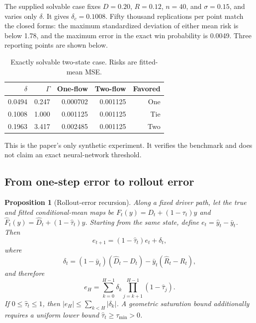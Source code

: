 \documentclass[twoside]{article}
\theoremstyle{plain}
\newtheorem{proposition}{Proposition}
\theoremstyle{definition}
\theoremstyle{remark}
\begin{document}
The supplied solvable case fixes \(D=0.20\), \(R=0.12\), \(n=40\), and
\(\sigma=0.15\), and varies only \(\delta\). It gives
\(\delta_c=0.1008\). Fifty thousand replications per point match the closed
forms: the maximum standardized deviation of either mean risk is below 1.78,
and the maximum error in the exact win probability is 0.0049. Three reporting
points are shown below.

\begin{table}[t]
\centering
\caption{Exactly solvable two-state case. Risks are fitted-mean MSE.}
\label{tab:solvable}
\small
\begin{tabular}{rrrrr}
\toprule
\(\delta\) & \(\Gamma\) & One-flow & Two-flow & Favored\\
\midrule
0.0494 & 0.247 & 0.000702 & 0.001125 & One\\
0.1008 & 1.000 & 0.001125 & 0.001125 & Tie\\
0.1963 & 3.417 & 0.002485 & 0.001125 & Two\\
\bottomrule
\end{tabular}
\end{table}

This is the paper's only synthetic experiment. It verifies the benchmark and
does not claim an exact neural-network threshold.

\subsection{From one-step error to rollout error}

\begin{proposition}[Rollout-error recursion]
\label{prop:rollout}
Along a fixed driver path, let the true and fitted conditional-mean maps be
\(F_t(y)=D_t+(1-\tau_t)y\) and
\(\widehat F_t(y)=\widehat D_t+(1-\widehat\tau_t)y\). Starting from the same
state, define \(e_t=\widehat y_t-\bar y_t\). Then
\begin{equation}
e_{t+1}=(1-\widehat\tau_t)e_t+\delta_t,
\end{equation}
where
\begin{equation}
\delta_t=(1-\bar y_t)(\widehat D_t-D_t)
-\bar y_t(\widehat R_t-R_t),
\end{equation}
and therefore
\begin{equation}
\boxed{
e_H=\sum_{k=0}^{H-1}\delta_k
\prod_{j=k+1}^{H-1}(1-\widehat\tau_j).}
\label{eq:rollout}
\end{equation}
If \(0\le\widehat\tau_t\le1\), then
\(|e_H|\le\sum_{k<H}|\delta_k|\). A geometric saturation bound additionally
requires a uniform lower bound \(\widehat\tau_t\ge\tau_{\min}>0\).
\end{proposition}
\end{document}
